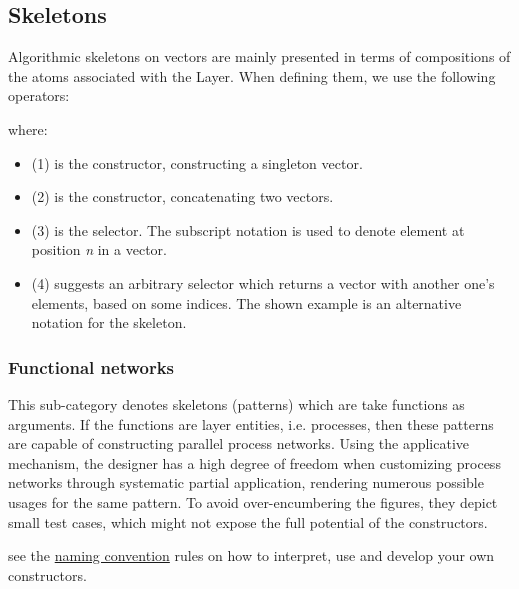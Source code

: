 \subsection{Skeletons}
Algorithmic skeletons on vectors are mainly presented in terms
 of compositions of the atoms associated with the
  Layer. When defining them,
 we use the following operators:\par
{}\par
where:\par
\begin{itemize}
\item
(1) is the  constructor, constructing a singleton vector.\par

\item
(2) is the \haddockid{<++>} constructor, concatenating two vectors.\par

\item
(3) is the  selector. The subscript notation is used to
 denote element at position \emph{n} in a vector.\par

\item
(4) suggests an arbitrary selector which returns a vector with
 another one's elements, based on some indices. The shown example
 is an alternative notation for the  skeleton.\par

\end{itemize}

\subsubsection{Functional networks}
This sub-category denotes skeletons (patterns) which are take
 functions as arguments. If the functions are
  layer entities, i.e. processes, then these
 patterns are capable of constructing parallel process
 networks. Using the applicative mechanism, the designer has a
 high degree of freedom when customizing process networks through
 systematic partial application, rendering numerous possible
 usages for the same pattern. To avoid over-encumbering the
 figures, they depict small test cases, which might not expose the
 full potential of the constructors.\par
see the \href{ForSyDe-Atom.html#naming_conv}{naming convention} rules
 on how to interpret, use and develop your own constructors.\par

